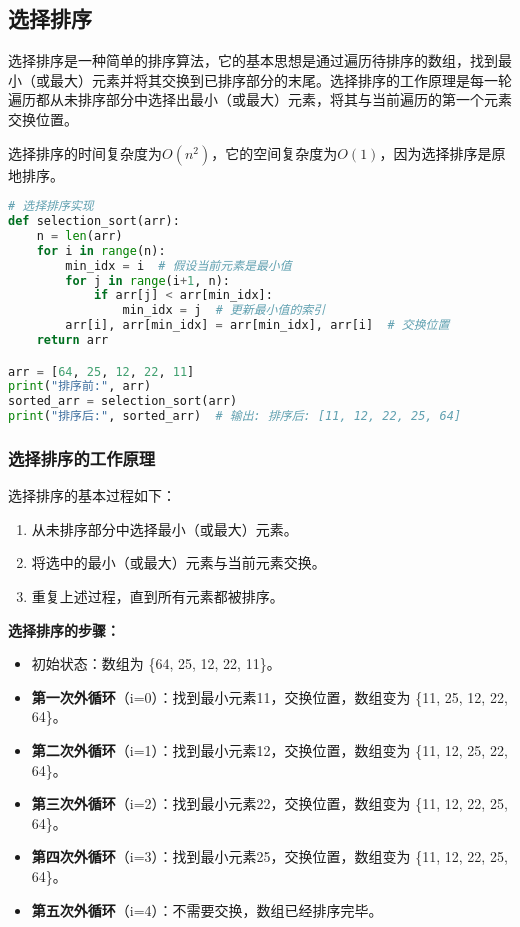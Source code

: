 \documentclass{article}
\begin{document}
\subsection{选择排序}
选择排序是一种简单的排序算法，它的基本思想是通过遍历待排序的数组，找到最小（或最大）元素并将其交换到已排序部分的末尾。选择排序的工作原理是每一轮遍历都从未排序部分中选择出最小（或最大）元素，将其与当前遍历的第一个元素交换位置。

选择排序的时间复杂度为$O(n^2)$，它的空间复杂度为$O(1)$，因为选择排序是原地排序。

\begin{lstlisting}[language=Python,caption=选择排序实现]
# 选择排序实现
def selection_sort(arr):
    n = len(arr)
    for i in range(n):
        min_idx = i  # 假设当前元素是最小值
        for j in range(i+1, n):
            if arr[j] < arr[min_idx]:
                min_idx = j  # 更新最小值的索引
        arr[i], arr[min_idx] = arr[min_idx], arr[i]  # 交换位置
    return arr

arr = [64, 25, 12, 22, 11]
print("排序前:", arr)
sorted_arr = selection_sort(arr)
print("排序后:", sorted_arr)  # 输出: 排序后: [11, 12, 22, 25, 64]
\end{lstlisting}

\subsubsection{选择排序的工作原理}
选择排序的基本过程如下：
\begin{enumerate}
    \item 从未排序部分中选择最小（或最大）元素。
    \item 将选中的最小（或最大）元素与当前元素交换。
    \item 重复上述过程，直到所有元素都被排序。
\end{enumerate}

\noindent
\textbf{选择排序的步骤：}
\begin{itemize}
    \item 初始状态：数组为 \{64, 25, 12, 22, 11\}。
    \item \textbf{第一次外循环}（i=0）：找到最小元素11，交换位置，数组变为 \{11, 25, 12, 22, 64\}。
    \item \textbf{第二次外循环}（i=1）：找到最小元素12，交换位置，数组变为 \{11, 12, 25, 22, 64\}。
    \item \textbf{第三次外循环}（i=2）：找到最小元素22，交换位置，数组变为 \{11, 12, 22, 25, 64\}。
    \item \textbf{第四次外循环}（i=3）：找到最小元素25，交换位置，数组变为 \{11, 12, 22, 25, 64\}。
    \item \textbf{第五次外循环}（i=4）：不需要交换，数组已经排序完毕。
\end{itemize}
\end{document}
